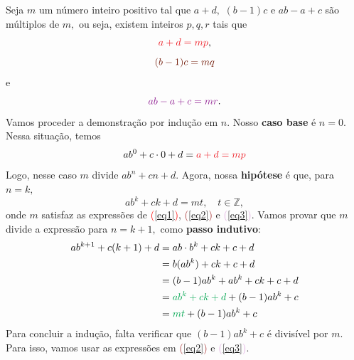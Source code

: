 \documentclass[12pt, a4paper]{article}
\begin{document}
\begin{solution}
Seja $m$ um número inteiro positivo tal que $a + d,$ $(b-1)c$ e $ab-a+c$ são múltiplos de $m,$ ou seja, existem inteiros $p, q, r$ tais que
\begin{equation}\label{eq1}
\textcolor{Red}{a + d = mp},
\end{equation}
\begin{equation}\label{eq2}
 \textcolor{Brown}{(b-1)c = mq}
\end{equation}
e
\begin{equation}\label{eq3}
 \textcolor{Plum}{ab - a + c = mr}.
\end{equation}
Vamos proceder a demonstração por indução em $n.$ Nosso \textbf{caso base} é $n = 0$. Nessa situação, temos
\[
ab^0 + c \cdot 0 + d = \textcolor{Red}{a + d = mp}
\]
Logo, nesse caso $m$ divide $ab^n + cn + d.$ Agora, nossa \textbf{hipótese} é que, para $n = k,$ 
\[
ab^k + ck + d = mt, \quad t \in \mathbb{Z},
\]
onde $m$ satisfaz as expressões de \textcolor{Red}{(\ref{eq1})}, \textcolor{Brown}{(\ref{eq2})} e \textcolor{Plum}{(\ref{eq3})}.
Vamos provar que $m$ divide a expressão para $n = k +1,$ como \textbf{passo indutivo}:
\begin{align*}
    ab^{k+1} + c(k+1) + d &= ab \cdot b^k + ck + c + d \\&= b(ab^k) + ck + c + d \\&= (b-1)ab^k + ab^k + ck + c + d \\&= \textcolor{Green}{ab^k + ck + d} + (b-1)ab^k + c \\&= \textcolor{Green}{mt} + (b-1)ab^k + c
\end{align*}
Para concluir a indução, falta verificar que $(b-1)ab^k + c$ é divisível por $m.$ Para isso, vamos usar as expressões em \textcolor{Brown}{(\ref{eq2})} e \textcolor{Plum}{(\ref{eq3})}.


\end{solution}
\end{document}
